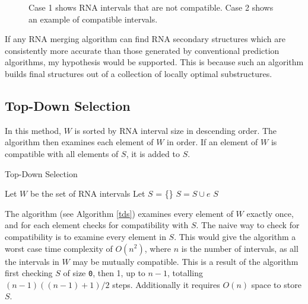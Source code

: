 \documentclass{cshonours}
\begin{document}
\begin{figure}
\begin{center}
\end{center}
\caption{Case 1 shows RNA intervals that are not compatible. Case 2 shows an example of compatible intervals.}
\label{fig:compatible}
\end{figure}

If any RNA merging algorithm can find RNA secondary structures which are consistently more accurate than those generated by conventional prediction algorithms, my hypothesis would be supported. This is because such an algorithm builds final structures out of a collection of locally optimal substructures.

\subsection{Top-Down Selection}
In this method, $W$ is sorted by RNA interval size in descending order. The algorithm then examines each element of $W$ in order. If an element of $W$ is compatible with all elements of $S$, it is added to $S$.

\begin{algorithm}
  \caption{Top-Down Selection}
  \label{tds}
  \begin{algorithmic}[1]
  \State Let $W$ be the set of RNA intervals
  \State Let $S$ = \{\}
  \State {}
  		\State $S = S \cup e$
  	\EndIf
  \EndFor
  \State \Return $S$
  \end{algorithmic}
\end{algorithm}

	
The algorithm (see Algorithm \ref{tds}) examines every element of $W$ exactly once, and for each element checks for compatibility with $S$. The naive way to check for compatibility is to examine every element in $S$. This would give the algorithm a worst case time complexity of $O(n^2)$, where $n$ is the number of intervals, as all the intervals in $W$ may be mutually compatible. This is a result of the algorithm first checking $S$ of size \texttt{0}, then 1, up to $n-1$, totalling $(n-1)((n-1)+1) / 2$ steps. Additionally it requires $O(n)$ space to store $S$.
\end{document}
